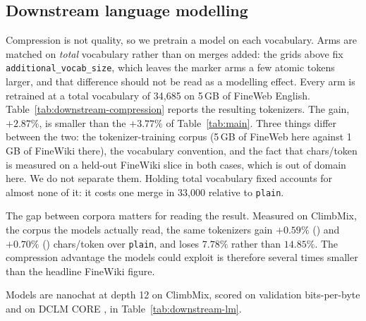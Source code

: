 %
%
\subsection{Downstream language modelling}
\label{sec:downstream}

Compression is not quality, so we pretrain a model on each vocabulary. Arms are matched on
\emph{total} vocabulary rather than on merges added: the grids above fix
\texttt{additional\_vocab\_size}, which leaves the marker arms a few atomic tokens larger, and
that difference should not be read as a modelling effect. Every arm is retrained at a total
vocabulary of 34{,}685 on 5\,GB of FineWeb English. Table~\ref{tab:downstream-compression} reports the
resulting tokenizers. The gain, $+2.87\%$, is smaller than the $+3.77\%$ of
Table~\ref{tab:main}. Three things differ between the two: the tokenizer-training corpus
(5\,GB of FineWeb here against 1\,GB of FineWiki there), the vocabulary convention, and the
fact that chars/token is measured on a held-out FineWiki slice in both cases, which is out of
domain here. We do not separate them. Holding total vocabulary fixed accounts for almost none
of it: it costs  one merge in 33{,}000 relative to \texttt{plain}.

The gap between corpora matters for reading the result. Measured on ClimbMix, the corpus the
models actually read, the same tokenizers gain $+0.59\%$ () and $+0.70\%$
() chars/token over \texttt{plain}, and  loses $7.78\%$ rather than
$14.85\%$. The compression advantage the models could exploit is therefore several times
smaller than the headline FineWiki figure.

Models are nanochat at depth 12 on ClimbMix, scored on validation bits-per-byte and on DCLM
CORE \citep{li2024datacomplm}, in Table~\ref{tab:downstream-lm}.

